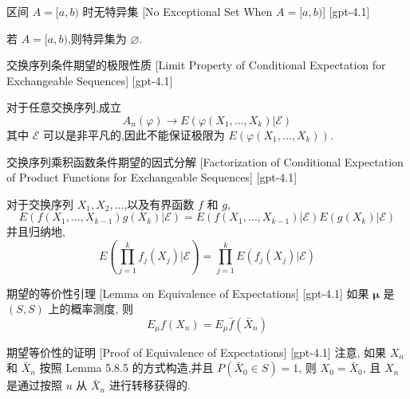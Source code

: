 \documentclass[UTF8]{ctexart}
\begin{document}
    
    
    \begin{thm}
        [No-Exceptional-Set-When-$A-=-[a-b$]
        {区间 $A = [a, b)$ 时无特异集}
        [No Exceptional Set When $A = [a, b)$]
        [gpt-4.1]
        
若 $A = [ a , b )$,则特异集为 $\varnothing$.

    \end{thm}
    
    
    
    \begin{thm}
        {交换序列条件期望的极限性质}
        [Limit Property of Conditional Expectation for Exchangeable Sequences]
        [gpt-4.1]
        
对于任意交换序列,成立
\[
A_n(\varphi) \to E(\varphi(X_1, \dots, X_k) | \mathcal{E})
\]
其中 $\mathcal{E}$ 可以是非平凡的,因此不能保证极限为 $E(\varphi(X_1, \ldots, X_k))$.

    \end{thm}
    
    
    
    \begin{thm}
        {交换序列乘积函数条件期望的因式分解}
        [Factorization of Conditional Expectation of Product Functions for Exchangeable Sequences]
        [gpt-4.1]
        
对于交换序列 $X_1, X_2, \ldots$,以及有界函数 $f$ 和 $g$,
\[
E(f(X_1, \dots, X_{k-1}) g(X_k) | \mathcal{E}) = E(f(X_1, \dots, X_{k-1}) | \mathcal{E}) E(g(X_k) | \mathcal{E})
\]
并且归纳地,
\[
E\left( \prod_{j=1}^k f_j(X_j) \Bigg| \mathcal{E} \right) = \prod_{j=1}^k E(f_j(X_j) | \mathcal{E})
\]

    \end{thm}
    
    
    
    \begin{lma}
        {期望的等价性引理}
        [Lemma on Equivalence of Expectations]
        [gpt-4.1]
        如果 $\boldsymbol{\mu}$ 是 $(S, S)$ 上的概率测度, 则
\[
E_\mu f(X_n) = E_\mu \bar{f}(\bar{X}_n)
\]

    \end{lma}
    
    
    
    \begin{prf}
        {期望等价性的证明}
        [Proof of Equivalence of Expectations]
        [gpt-4.1]
        注意, 如果 $X_n$ 和 $\bar{X}_n$ 按照 Lemma 5.8.5 的方式构造,并且 $P(\bar{X}_0 \in S) = 1$, 则 $X_0 = \bar{X}_0$, 且 $X_n$ 是通过按照 $
u$ 从 $\bar{X}_n$ 进行转移获得的.
    \end{prf}
    
\end{document}
